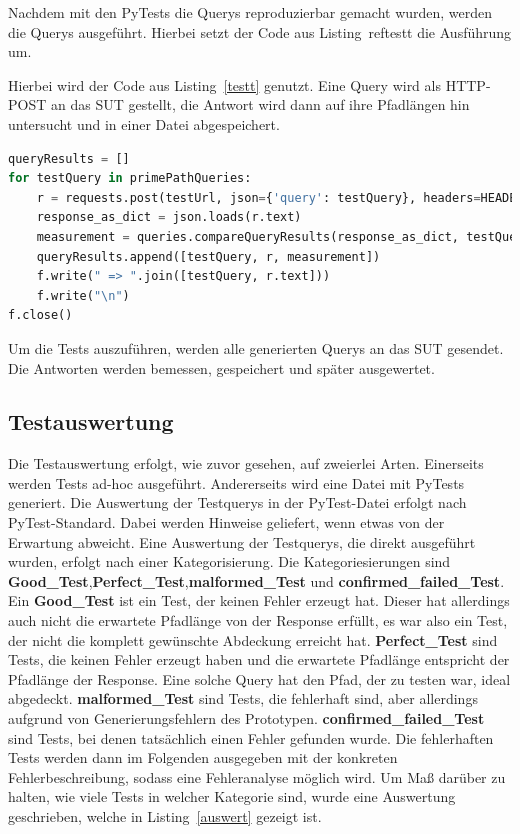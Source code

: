 Nachdem mit den PyTests die Querys reproduzierbar gemacht wurden, werden die Querys ausgeführt.
Hierbei setzt der Code aus Listing~ref{testt} die Ausführung um.


Hierbei wird der Code aus Listing~\ref{testt} genutzt.
Eine Query wird als HTTP-POST an das SUT gestellt, die Antwort wird dann auf ihre Pfadlängen hin untersucht und in
einer Datei abgespeichert.

\begin{lstlisting}[language=Python, caption={Ausführen einer Testquery}, label={testt}]
queryResults = []
for testQuery in primePathQueries:
    r = requests.post(testUrl, json={'query': testQuery}, headers=HEADERS)
    response_as_dict = json.loads(r.text)
    measurement = queries.compareQueryResults(response_as_dict, testQuery)
    queryResults.append([testQuery, r, measurement])
    f.write(" => ".join([testQuery, r.text]))
    f.write("\n")
f.close()
\end{lstlisting}

Um die Tests auszuführen, werden alle generierten Querys an das SUT gesendet.
Die Antworten werden bemessen, gespeichert und später ausgewertet.

\subsection{Testauswertung}

Die Testauswertung erfolgt, wie zuvor gesehen, auf zweierlei Arten.
Einerseits werden Tests ad-hoc ausgeführt.
Andererseits wird eine Datei mit PyTests generiert.
Die Auswertung der Testquerys in der PyTest-Datei erfolgt nach PyTest-Standard. Dabei werden Hinweise geliefert, wenn etwas von der Erwartung abweicht.
Eine Auswertung der Testquerys, die direkt ausgeführt wurden, erfolgt nach einer Kategorisierung.
Die Kategoriesierungen sind \textbf{Good\_Test},\textbf{Perfect\_Test},\textbf{malformed\_Test} und \textbf{confirmed\_failed\_Test}.
Ein \textbf{Good\_Test} ist ein Test, der keinen Fehler erzeugt hat.
Dieser hat allerdings auch nicht die erwartete Pfadlänge von der Response erfüllt, es war also ein Test,
der nicht die komplett gewünschte Abdeckung erreicht hat.
\textbf{Perfect\_Test} sind Tests, die keinen Fehler erzeugt haben und die erwartete Pfadlänge entspricht der Pfadlänge der Response.
Eine solche Query hat den Pfad, der zu testen war, ideal abgedeckt.
\textbf{malformed\_Test} sind Tests, die fehlerhaft sind, aber allerdings aufgrund von Generierungsfehlern des Prototypen.
\textbf{confirmed\_failed\_Test} sind Tests, bei denen tatsächlich einen Fehler gefunden wurde.
Die fehlerhaften Tests werden dann im Folgenden ausgegeben mit der konkreten Fehlerbeschreibung, sodass eine Fehleranalyse möglich wird.
Um Maß darüber zu halten, wie viele Tests in welcher Kategorie sind, wurde eine Auswertung geschrieben, welche in Listing~\ref{auswert} gezeigt ist.

